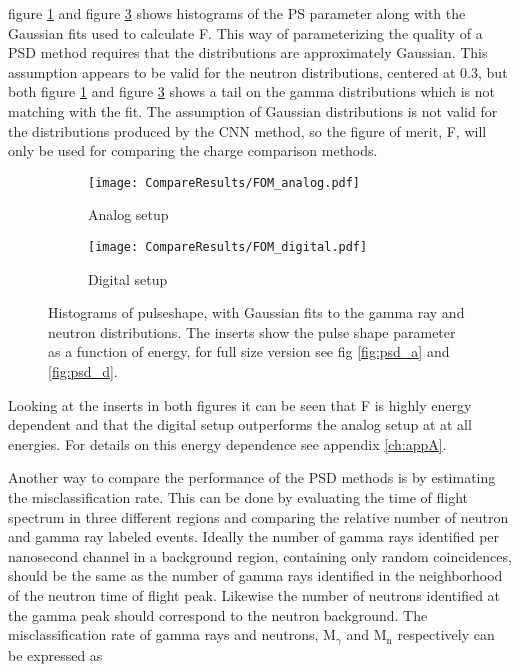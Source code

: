 \documentclass[main.tex]{subfiles}
\begin{document}
figure \ref{fig:fom_analog} and figure \ref{fig:fom_digital} shows histograms of the PS parameter along with the Gaussian fits used to calculate F. This way of parameterizing the quality of a PSD method requires that the distributions are approximately Gaussian. This assumption appears to be valid for the neutron distributions, centered at 0.3, but both figure \ref{fig:fom_analog} and figure \ref{fig:fom_digital} shows a tail on the gamma distributions which is not matching with the fit. The assumption of Gaussian distributions is not valid for the distributions produced by the CNN method, so the figure of merit, F, will only be used for comparing the charge comparison methods. 


\begin{figure}[h]
	\begin{subfigure}[b]{\textwidth}
	    \centering
    	    \texttt{[image: CompareResults/FOM\_analog.pdf]}
        	\caption{Analog setup}
	    \label{fig:fom_analog} 
	\end{subfigure}
	\begin{subfigure}[b]{\textwidth}
    	\centering
        	\texttt{[image: CompareResults/FOM\_digital.pdf]}
        	\caption{Digital setup}
    	\label{fig:fom_digital} 
    \end{subfigure}
    \caption[Histograms of pulseshape, with Gaussian fits.]{Histograms of pulseshape, with Gaussian fits to the gamma ray and neutron distributions. The inserts show the pulse shape parameter as a function of energy, for full size version see fig \ref{fig:psd_a} and \ref{fig:psd_d}. }
\end{figure}

Looking at the inserts in both figures it can be seen that F is highly energy dependent and that the digital setup outperforms the analog setup at at all energies. For details on this energy dependence see appendix \ref{ch:appA}. 

Another way to compare the performance of the PSD methods is by estimating the misclassification rate. This can be done by evaluating the time of flight spectrum in three different regions and comparing the relative number of neutron and gamma ray labeled events. Ideally the number of gamma rays identified per nanosecond channel in a background region, containing only random coincidences, should be the same as the number of gamma rays identified in the neighborhood of the neutron time of flight peak. Likewise the number of neutrons identified at the gamma peak should correspond to the neutron background. The misclassification rate of gamma rays and neutrons, 
M$_{\gamma}$ and M$_\textrm{n}$ respectively can be expressed as
\end{document}
